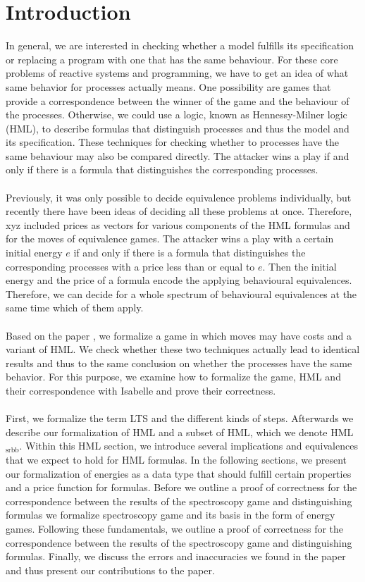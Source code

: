 \newpage
\section{Introduction} %
In general, we are interested in checking whether a model fulfills its specification or replacing a program with one that has the same behaviour.
For these core problems of reactive systems and programming, we have to get an idea of what same behavior for processes actually means.
One possibility are games that provide a correspondence between the winner of the game and the behaviour of the processes.
Otherwise, we could use a logic, known as Hennessy-Milner logic (HML), to describe formulas that distinguish processes and thus the model and its specification.
These techniques for checking whether to processes have the same behaviour may also be compared directly.
The attacker wins a play if and only if there is a formula that distinguishes the corresponding processes.
\\\\
Previously, it was only possible to decide equivalence problems individually, but recently there have been ideas of deciding all these problems at once.
Therefore, xyz included prices as vectors for various components of the HML formulas and for the moves of equivalence games.
The attacker wins a play with a certain initial energy $e$ if and only if there is a formula that distinguishes the corresponding processes with a price less than or equal to $e$.
Then the initial energy and the price of a formula encode the applying behavioural equivalences.
Therefore, we can decide for a whole spectrum of behavioural equivalences at the same time which of them apply.
\\\\
Based on the paper \cite{bisping2023lineartimebranchingtime}, we formalize a game in which moves may have costs and a variant of HML.
We check whether these two techniques actually lead to identical results and thus to the same conclusion on whether the processes have the same behavior.
For this purpose, we examine how to formalize the game, HML and their correspondence with Isabelle and prove their correctness.
\\\\
First, we formalize the term LTS and the different kinds of steps.
Afterwards we describe our formalization of HML and a subset of HML, which we denote HML$_\text{srbb}$.
Within this HML section, we introduce several implications and equivalences that we expect to hold for HML formulas.
In the following sections, we present our formalization of energies as a data type that should fulfill certain properties and a price function for formulas.
Before we outline a proof of correctness for the correspondence between the results of the spectroscopy game and distinguishing formulas we formalize spectroscopy game and its basis in the form of energy games.
Following these fundamentals, we outline a proof of correctness for the correspondence between the results of the spectroscopy game and distinguishing formulas.
Finally, we discuss the errors and inaccuracies we found in the paper and thus present our contributions to the paper\cite{bisping2023lineartimebranchingtime}.